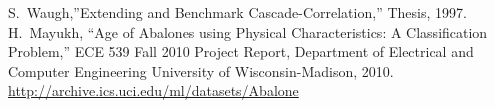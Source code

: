 \documentclass[10pt, paper=a4]{article}
\begin{document}
\begin{thebibliography}{99}
 S.~Waugh,''Extending and Benchmark
  Cascade-Correlation,'' Thesis, 1997.
 H.~Mayukh, ``Age of Abalones using Physical
  Characteristics: A Classification Problem,'' ECE 539 Fall 2010
  Project Report, Department of Electrical and Computer Engineering
  University of Wisconsin-Madison, 2010.
 \url{http://archive.ics.uci.edu/ml/datasets/Abalone}
\end{thebibliography}
\end{document}
